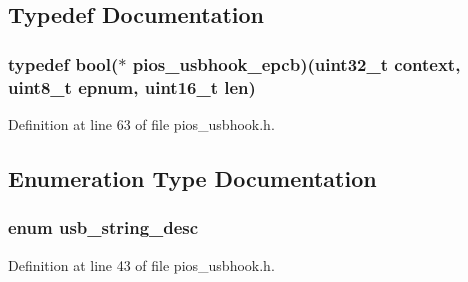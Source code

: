 \subsection{Typedef Documentation}
\hypertarget{group___p_i_o_s___u_s_b_h_o_o_k_ga5f7904cd3922ab7207afebe3d9ef2650}{
\subsubsection[{pios\-\_\-usbhook\-\_\-epcb}]{\setlength{\rightskip}{0pt plus 5cm}typedef {\bf bool}($\ast$ pios\-\_\-usbhook\-\_\-epcb)({\bf uint32\-\_\-t} context, {\bf uint8\-\_\-t} epnum, {\bf uint16\-\_\-t} {\bf len})}}\label{group___p_i_o_s___u_s_b_h_o_o_k_ga5f7904cd3922ab7207afebe3d9ef2650}


Definition at line 63 of file pios\-\_\-usbhook.\-h.



\subsection{Enumeration Type Documentation}
\hypertarget{group___p_i_o_s___u_s_b_h_o_o_k_ga5a1ae5206971f0c296fa30b24e8725da}{
\subsubsection[{usb\-\_\-string\-\_\-desc}]{\setlength{\rightskip}{0pt plus 5cm}enum {\bf usb\-\_\-string\-\_\-desc}}}\label{group___p_i_o_s___u_s_b_h_o_o_k_ga5a1ae5206971f0c296fa30b24e8725da}


Definition at line 43 of file pios\-\_\-usbhook.\-h.



